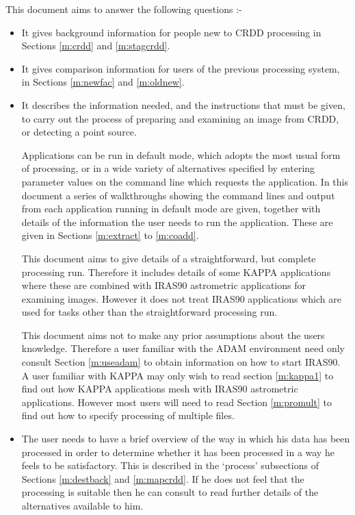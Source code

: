 This document aims to answer the following questions :-
\begin{itemize}

\item It gives background information for people new to CRDD processing in
Sections \ref{m:crdd} and \ref{m:stagcrdd}.

\item It gives comparison information for users of the previous processing
system, in Sections \ref{m:newfac} and \ref{m:oldnew}.

\item It describes the information needed, and the instructions that must be
given, to carry out the process of preparing and examining an image from CRDD,
or detecting a point source.

Applications can be run in default mode, which adopts the most usual form of
processing, or in a wide variety of alternatives specified by entering parameter
values on the command line which requests the application. In this document a
series of walkthroughs showing the command lines and output from each
application running in default mode are given, together with details of the
information the user needs to run the application. These are given in
Sections \ref{m:extract} to \ref{m:coadd}.

This document aims to give details of a straightforward, but complete processing
run. Therefore it includes details of some KAPPA applications where these are
combined with IRAS90 astrometric applications for examining images. However it
does not treat IRAS90 applications which are used for tasks other than the
straightforward processing run.

This document aims not to make any prior assumptions about the users knowledge.
Therefore a user familiar with the ADAM environment need only consult Section
\ref{m:useadam} to obtain information on how to start IRAS90. A user familiar
with KAPPA may only wish to read section \ref{m:kappa1} to find out how KAPPA
applications mesh with IRAS90 astrometric applications. However most users will
need to read Section \ref{m:promult} to find out how to specify processing of
multiple files. 

\item The user needs to have a brief overview of the way in which his data has
been processed in order to determine whether it has been processed in a way he
feels to be satisfactory. This is described in the `process' subsections of
Sections \ref{m:destback} and \ref{m:mapcrdd}. If he does not feel that
the processing is suitable then he can consult
 to read further details
of the alternatives available to him.


\end{itemize}
